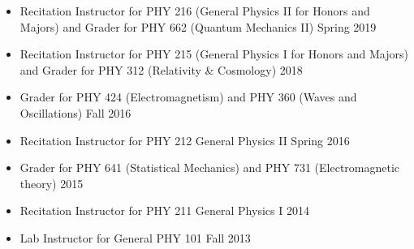 
\begin{itemize}
 \item Recitation Instructor for PHY 216 (General Physics II for Honors and Majors) and Grader for PHY 662 (Quantum Mechanics II)  \hfill Spring 2019 
 \item Recitation Instructor for PHY 215 (General Physics I for Honors and Majors) and Grader for PHY 312 (Relativity \& Cosmology)   \hfill 2018 
 \item Grader for PHY 424 (Electromagnetism) and PHY 360 (Waves and Oscillations)  \hfill Fall 2016
 \item Recitation Instructor for PHY 212 General Physics II \hfill Spring 2016
 \item Grader for PHY 641 (Statistical Mechanics) and PHY 731 (Electromagnetic theory)  \hfill 2015 %
 \item Recitation Instructor for PHY 211 General Physics I \hfill 2014 %
 \item Lab Instructor for General PHY 101 \hfill Fall 2013
 \end{itemize}
